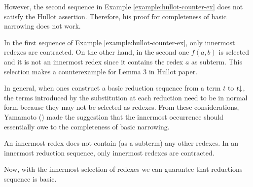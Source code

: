 However, the second sequence in Example \ref{example:hullot-counter-ex} does not satisfy the Hullot assertion. Therefore, his proof for completeness of basic narrowing does not work.

In the first sequence of Example \ref{example:hullot-counter-ex}, only innermost redexes are contracted. On the other hand, in the second one $f(a,b)$ is selected and it is not an innermost redex since it contains the redex $a$ as subterm. This selection makes a counterexample for Lemma 3 in Hullot paper.

In general, when ones construct a basic reduction sequence from a term $t$ to $t\mathord{\downarrow}$, the terms introduced by the substitution at each reduction need to be in normal form because they may not be selected as redexes. From these considerations, Yamamoto (\cite{10.1007/3-540-51564-X_51}) made the suggestion that the innermost occurrence should essentially owe to the completeness of basic narrowing.

\begin{definition}
	An innermost redex does not contain (as a subterm) any other redexes. In an innermost reduction sequence, only innermost redexes are contracted.
\end{definition}

Now, with the innermost selection of redexes we can guarantee that reductions sequence is basic.

